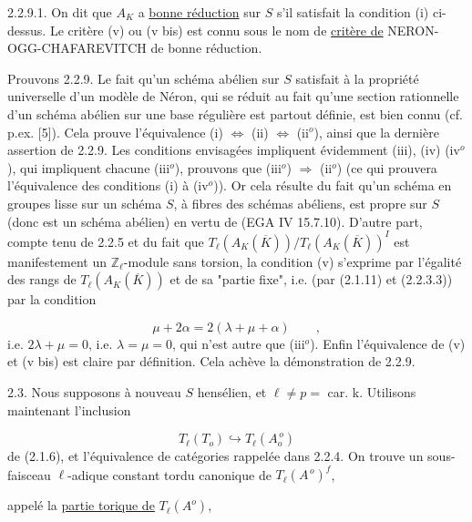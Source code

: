 2.2.9.1. On dit que $A_K$ a \underline{bonne réduction} sur $S$ s'il satisfait la condition (i) ci-dessus. Le critère (v) ou (v bis) est connu sous le nom de \underline{critère de} NERON-OGG-CHAFAREVITCH de bonne réduction.



Prouvons 2.2.9. Le fait qu'un schéma abélien sur $S$ satisfait à la propriété universelle d'un modèle de Néron, qui se réduit au fait qu'une section rationnelle d'un schéma abélien sur une base régulière est partout définie, est bien connu (cf. p.ex. [5]). Cela prouve l'équivalence (i) $\Longleftrightarrow$ (ii) $\Longleftrightarrow$ (ii$^o$), ainsi que la dernière assertion de 2.2.9. Les conditions envisagées impliquent évidemment (iii), (iv) (iv$^o$), qui impliquent chacune (iii$^o$), prouvons que (iii$^o$) $\Longrightarrow$ (ii$^o$) (ce qui prouvera l'équivalence des conditions (i) à (iv$^o$)). Or cela résulte du fait qu'un schéma en groupes lisse sur un schéma $S$, à fibres des schémas abéliens, est propre sur $S$ (donc est un schéma abélien) en vertu de (EGA IV 15.7.10). D'autre part, compte tenu de 2.2.5 et du fait que $T_\ell(A_K(\overline{K}))/T_\ell(A_K(\overline{K}))^I$ est manifestement un $\mathbb{Z}_\ell$-module sans torsion, la condition (v) s'exprime par l'égalité des rangs de $T_\ell(A_K(\overline{K}))$ et de sa "partie fixe", i.e. (par (2.1.11) et (2.2.3.3)) par la condition

\begin{equation*}
\mu + 2\alpha = 2(\lambda + \mu + \alpha) \qquad ,
\end{equation*}
i.e. $2\lambda + \mu = 0$, i.e. $\lambda = \mu = 0$, qui n'est autre que (iii$^o$). Enfin l'équivalence de (v) et (v bis) est claire par définition. Cela achève la démonstration de 2.2.9.

2.3. Nous supposons à nouveau $S$ hensélien, et $\ell \neq p =$ car. k. Utilisons maintenant l'inclusion

\begin{equation}\tag{2.3.1}
T_\ell(T_o) \hookrightarrow T_\ell(A_o^{\,o})
\end{equation}
de (2.1.6), et l'équivalence de catégories rappelée dans 2.2.4. On trouve un sous-faisceau $\ell$-adique constant tordu canonique de $T_\ell(A^{\,o})^f$,



appelé la \underline{partie torique de} $T_\ell(A^o)$,

